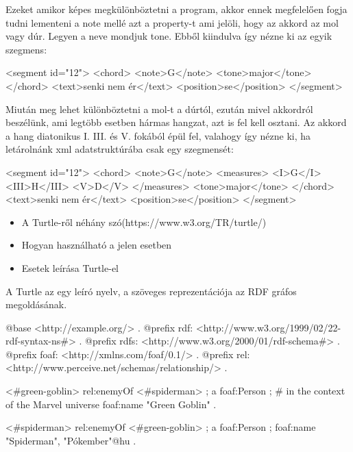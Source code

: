 Ezeket amikor képes megkülönböztetni a program, akkor ennek megfelelően fogja tudni lementeni a note mellé azt a property-t ami jelöli, hogy az akkord az mol vagy dúr. Legyen a neve mondjuk tone. Ebből kiindulva így nézne ki az egyik szegmens:
\begin{xml}
<segment id="12">
   <chord>
      <note>G</note>
      <tone>major</tone>
   </chord>
   <text>senki nem ér</text>
   <position>se</position>
</segment>
\end{xml}

Miután meg lehet különböztetni a mol-t a dúrtól, ezután mivel akkordról beszélünk, ami legtöbb esetben hármas hangzat, azt is fel kell osztani. Az akkord a hang diatonikus I. III. és V. fokából épül fel, valahogy így nézne ki, ha letárolnánk xml adatstruktúrába csak egy szegmensét:
\begin{xml}
<segment id="12">
   <chord>
      <note>G</note>
      <measures>
         <I>G</I>
         <III>H</III>
         <V>D</V>
      </measures>
      <tone>major</tone>
   </chord>
   <text>senki nem ér</text>
   <position>se</position>
</segment>
\end{xml}

\begin{itemize}
\item A Turtle-ről néhány szó(https://www.w3.org/TR/turtle/)
\item Hogyan használható a jelen esetben
\item Esetek leírása Turtle-el
\end{itemize}

A Turtle az egy leíró nyelv, a szöveges reprezentációja az RDF gráfos megoldásának.
\begin{xml}
@base <http://example.org/> .
@prefix rdf: <http://www.w3.org/1999/02/22-rdf-syntax-ns#> .
@prefix rdfs: <http://www.w3.org/2000/01/rdf-schema#> .
@prefix foaf: <http://xmlns.com/foaf/0.1/> .
@prefix rel: <http://www.perceive.net/schemas/relationship/> .

<#green-goblin>
	rel:enemyOf <#spiderman> ;
	a foaf:Person ;    # in the context of the Marvel universe
	foaf:name "Green Goblin" .

<#spiderman>
	rel:enemyOf <#green-goblin> ;
	a foaf:Person ;
	foaf:name "Spiderman", "Pókember"@hu .
\end{xml}




